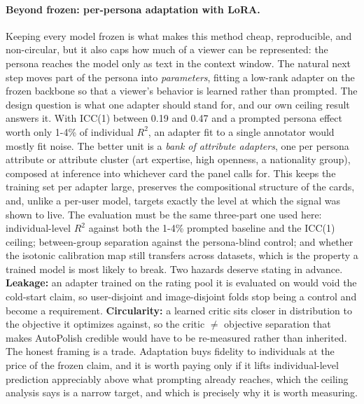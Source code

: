\documentclass[10pt,twocolumn,letterpaper]{article}
\begin{document}
\paragraph{Beyond frozen: per-persona adaptation with LoRA.} Keeping every model frozen is what makes this method cheap, reproducible, and non-circular, but it also caps how much of a viewer can be represented: the persona reaches the model only as text in the context window. The natural next step moves part of the persona into \emph{parameters}, fitting a low-rank adapter \citep{hu2022lora} on the frozen backbone so that a viewer's behavior is learned rather than prompted. The design question is what one adapter should stand for, and our own ceiling result answers it. With ICC(1) between 0.19 and 0.47 and a prompted persona effect worth only 1-4\% of individual $R^2$, an adapter fit to a single annotator would mostly fit noise. The better unit is a \emph{bank of attribute adapters}, one per persona attribute or attribute cluster (art expertise, high openness, a nationality group), composed at inference into whichever card the panel calls for. This keeps the training set per adapter large, preserves the compositional structure of the cards, and, unlike a per-user model, targets exactly the level at which the signal was shown to live. The evaluation must be the same three-part one used here: individual-level $R^2$ against both the 1-4\% prompted baseline and the ICC(1) ceiling; between-group separation against the persona-blind control; and whether the isotonic calibration map still transfers across datasets, which is the property a trained model is most likely to break. Two hazards deserve stating in advance. \textbf{Leakage:} an adapter trained on the rating pool it is evaluated on would void the cold-start claim, so user-disjoint and image-disjoint folds stop being a control and become a requirement. \textbf{Circularity:} a learned critic sits closer in distribution to the objective it optimizes against, so the critic $\neq$ objective separation that makes AutoPolish credible would have to be re-measured rather than inherited. The honest framing is a trade. Adaptation buys fidelity to individuals at the price of the frozen claim, and it is worth paying only if it lifts individual-level prediction appreciably above what prompting already reaches, which the ceiling analysis says is a narrow target, and which is precisely why it is worth measuring.


\clearpage
\onecolumn
\end{document}
